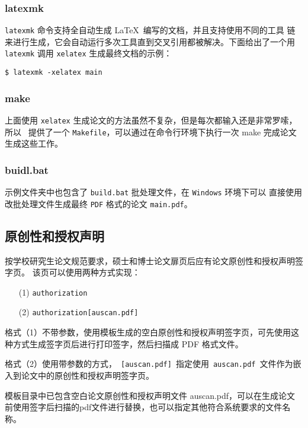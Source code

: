 \subsubsection{latexmk}
\label{sec:latexmk}
\texttt{latexmk} 命令支持全自动生成 \LaTeX\ 编写的文档，并且支持使用不同的工具
链来进行生成，它会自动运行多次工具直到交叉引用都被解决。下面给出了一个用
\texttt{latexmk} 调用 \texttt{xelatex} 生成最终文档的示例：
\begin{lstlisting}
$ latexmk -xelatex main
\end{lstlisting}

\subsubsection{make}
\label{sec:make}

上面使用 \texttt{xelatex} 生成论文的方法虽然不复杂，但是每次都输入还是非常罗嗦，所以 \heuthesis\ 
提供了一个 \texttt{Makefile}，可以通过在命令行环境下执行一次 make 完成论文生成这些工作。

\subsubsection{buidl.bat}
\label{sec:build}

示例文件夹中也包含了 \texttt{build.bat} 批处理文件，在 \texttt{Windows} 环境下可以
直接使用改批处理文件生成最终 \texttt{PDF} 格式的论文 \texttt{main.pdf}。

\subsection{原创性和授权声明}
\label{sec:generate-auth}

按学校研究生论文规范要求，硕士和博士论文扉页后应有论文原创性和授权声明签字页。
该页可以使用两种方式实现：

\begin{enumerate}
  \item[(1)] \texttt{\cs authorization} 
  \item[(2)] \texttt{\cs authorization[auscan.pdf]} 
\end{enumerate}

格式（1）不带参数，使用模板生成的空白原创性和授权声明签字页，可先使用这种方式生成签字页后进行打印签字，然后扫描成 PDF 格式文件。

格式（2）使用带参数的方式，~\texttt{[auscan.pdf]}~指定使用~\texttt{auscan.pdf}~文件作为嵌入到论文中的原创性和授权声明签字页。

模板目录中已包含空白论文原创性和授权声明文件 auscan.pdf，可以在生成论文前使用签字后扫描的pdf文件进行替换，也可以指定其他符合系统要求的文件名称。


